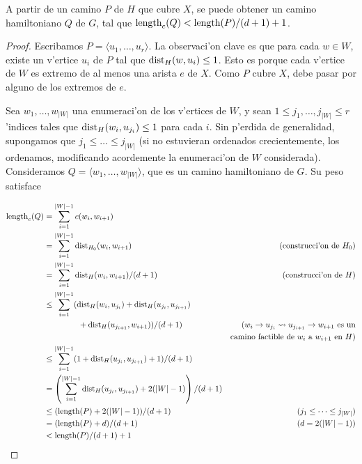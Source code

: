 \begin{lemma}
\label{le:grid_sr_to_rectilinear_ptsp}
A partir de un camino $P$ de $H$ que cubre $X$, se puede obtener un camino hamiltoniano $Q$ de $G$, tal que $\textnormal{length}_c(Q) < \textnormal{length}(P) / (d + 1) + 1$.

\begin{proof}
Escribamos $P = \langle u_1, \dots, u_r \rangle$. La observaci'on clave es que para cada $w \in W$, existe un v'ertice $u_i$ de $P$ tal que $\textnormal{dist}_H(w, u_i) \leq 1$. Esto es porque cada v'ertice de $W$ es extremo de al menos una arista $e$ de $X$. Como $P$ cubre $X$, debe pasar por alguno de los extremos de $e$.

Sea $w_1, \dots, w_{|W|}$ una enumeraci'on de los v'ertices de $W$, y sean $1 \leq j_1, \dots, j_{|W|} \leq r$ 'indices tales que $\textnormal{dist}_H(w_i, u_{j_i}) \leq 1$ para cada $i$. Sin p'erdida de generalidad, supongamos que $j_1 \leq \dots \leq j_{|W|}$ (si no estuvieran ordenados crecientemente, los ordenamos, modificando acordemente la enumeraci'on de $W$ considerada). Consideramos $Q = \langle w_1, \dots, w_{|W|}\rangle$, que es un camino hamiltoniano de $G$. Su peso satisface

\begin{align*}
\textnormal{length}_c(Q) &= \sum_{i = 1}^{|W| - 1}c(w_i, w_{i + 1}) &\\
&= \sum_{i = 1}^{|W| - 1} \textnormal{dist}_{H_0}(w_i, w_{i + 1}) & \text{(construcci'on de } H_0 \text{)}\\
&= \sum_{i = 1}^{|W| - 1} \textnormal{dist}_{H}(w_i, w_{i + 1}) / (d + 1) & \text{(construcci'on de } H \text{)}\\
&\leq \sum_{i = 1}^{|W| - 1} (\textnormal{dist}_{H}(w_i, u_{j_i}) + \textnormal{dist}_{H}(u_{j_i}, u_{j_{i + 1}}) &\\
& \hspace{1.5cm} + \textnormal{dist}_{H}(u_{j_{i + 1}}, w_{i + 1})) / (d + 1) & \text{(} w_i \to u_{j_i} \rightsquigarrow u_{j_{i + 1}} \to w_{i + 1} \text{ es un}\\
& & \text{camino factible de } w_i \text{ a } w_{i + 1} \text{ en } H \text{)} \\
&\leq \sum_{i = 1}^{|W| - 1} (1 + \textnormal{dist}_{H}(u_{j_i}, u_{j_{i + 1}}) + 1) / (d + 1) &\\
&= \left( \sum_{i = 1}^{|W| - 1} \textnormal{dist}_{H}(u_{j_i}, u_{j_{i + 1}}) + 2(|W| - 1) \right) / (d + 1) &\\
&\leq (\textnormal{length}(P) + 2(|W| - 1)) / (d + 1) & \text{(} j_1 \leq \dots \leq j_{|W|} \text{)}\\
&= (\textnormal{length}(P) + d) / (d + 1) & \text{(} d = 2(|W| - 1) \text{)}\\
&< \textnormal{length}(P) / (d + 1) + 1 &
\end{align*}
\end{proof}
\end{lemma}

